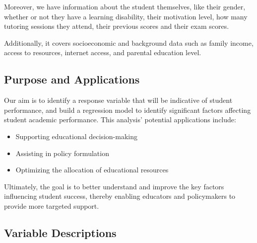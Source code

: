 \documentclass[twocolumn]{article} %
\begin{document}
Moreover, we have information about the student themselves, like their gender, whether or not they have a learning disability, their motivation level, how many tutoring sessions they attend, their previous scores and their exam scores.

Additionally, it covers socioeconomic and background data such as family income, access to resources, internet access, and parental education level.

\subsection*{Purpose and Applications}\label{purpose-and-applications}

Our aim is to identify a response variable that will be indicative of student performance, and build a regression model to identify significant factors affecting student academic performance. This analysis' potential applications include:

\begin{itemize}
\item
    Supporting educational decision-making
\item
    Assisting in policy formulation
\item
    Optimizing the allocation of educational resources
\end{itemize}

Ultimately, the goal is to better understand and improve the key factors
influencing student success, thereby enabling educators and policymakers
to provide more targeted support.

\subsection*{Variable Descriptions}\label{variable-descriptions}
\end{document}
